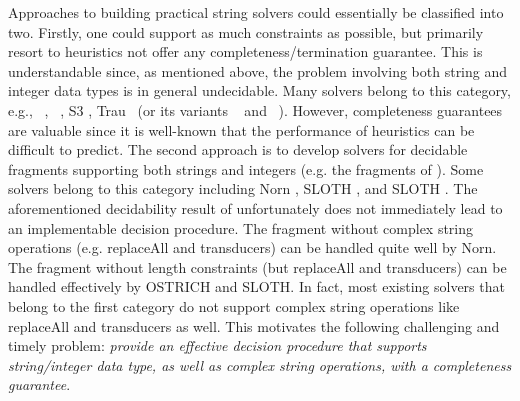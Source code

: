 Approaches to building practical string solvers could essentially be classified
into two. Firstly, one could support as much constraints as possible, but 
primarily resort to heuristics not
offer any completeness/termination guarantee. This is understandable since, as
mentioned above, the problem involving both string and integer data types is in 
general undecidable. Many solvers
belong to this category, e.g., 
{\cvc}~\cite{cvc4}, {\zthree}~\cite{Z3-str3}, S3 \cite{S3,TCJ16},
Trau~\cite{Abdulla17} (or its variants {\trauplus}~\cite{AbdullaA+19} and {\zthreetrau}~\cite{Z3-trau}).
%
However, completeness guarantees are valuable since it is well-known that the 
performance of heuristics can be difficult to predict.
The second approach is to develop solvers for decidable fragments
supporting both strings and integers (e.g. the fragments of
\cite{Vijay-length,BFL13,Abdulla14,AbdullaA+19,LB16,CCH+18,CHL+19,HJLRV18}). 
Some solvers belong to this category including Norn \cite{Abdulla14}, SLOTH
\cite{HJLRV18}, and SLOTH \cite{CHL+19}. 
The aforementioned decidability result of \cite{LB16} unfortunately does not
immediately lead to an implementable decision procedure.
The fragment without complex string operations (e.g. replaceAll and
transducers) can be handled quite well by Norn. The fragment without length
constraints (but replaceAll and transducers)
can be handled effectively by OSTRICH and SLOTH. 
In fact, most existing solvers that belong to the first category do not support
complex string operations like replaceAll and transducers as well.
This motivates the following challenging and timely problem: \emph{provide an
effective decision procedure that supports string/integer data type, as well
as complex string operations, with a completeness guarantee}.



